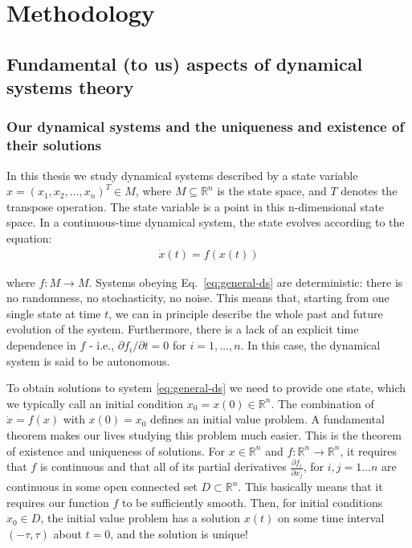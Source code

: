 \chapter{Methodology}

\section[Multistability]{Fundamental (to us) aspects of dynamical systems theory}

\subsection{Our dynamical systems and the uniqueness and existence of their solutions}
In this thesis we study dynamical systems described by a state variable $x = (x_1, x_2, \ldots, x_n)^T \in M $, where $M \subseteq \mathbb{R}^n$ is the state space, and $T$ denotes the transpose operation. The state variable is a point in this n-dimensional state space. In a continuous-time dynamical system, the state evolves according to the equation:
%
\begin{align}
    \dot{x}(t) = f(x(t))
    \label{eq:general-ds}
\end{align}

where $f:M\to M$. Systems obeying Eq.~\ref{eq:general-ds} are deterministic: there is no randomness, no stochasticity, no noise. This means that, starting from one single state at time $t$, we can in principle describe the whole past and future evolution of the system. Furthermore, there is a lack of an explicit time dependence in $f$ - i.e., ${\partial f_i}/{\partial t} = 0$ for $i=1, \ldots, n$. In this case, the dynamical system is said to be autonomous. 

To obtain solutions to system \ref{eq:general-ds} we need to provide one state, which we typically call an initial condition $x_0 = x(0) \in \mathbb{R}^n$. The combination of $\dot{x} = f(x)$ with $x(0) = x_0$ defines an initial value problem. A fundamental theorem makes our lives studying this problem much easier. This is the theorem of existence and uniqueness of solutions. For $x \in \mathbb{R}^n$ and $f:\mathbb{R}^n\to\mathbb{R}^n$, it requires that $f$ is continuous and that all of its partial derivatives $\frac{\partial f_i}{\partial x_j}$, for $i, j = 1\ldots n$ are continuous in some open connected set $D \subset \mathbb{R}^n$. This basically means that it requires our function $f$ to be sufficiently smooth. Then, for initial conditions $x_0 \in D$, the initial value problem has a solution $x(t)$ on some time interval $(-\tau, \tau)$ about $t=0$, and the solution is unique! \cite{strogatz2002nonlinear} 

